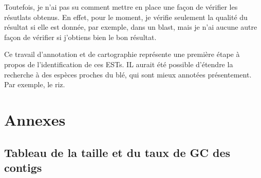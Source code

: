 \documentclass[10.9pt]{article} %
\renewcommand{\thesubsection}{\alph{subsection}}
\begin{document}
Toutefois, je n'ai pas su comment mettre en place une façon de vérifier les résutlats obtenus. En effet, pour le moment, je vérifie
seulement la qualité du résultat si elle est donnée, par exemple, dans un blast, mais je n'ai aucune autre façon de vérifier si
j'obtiens bien le bon résultat.

Ce travail d'annotation et de cartographie représente une première étape à propos de l'identification de ces ESTs. IL aurait été 
possible d'étendre la recherche à des espèces proches du blé, qui sont mieux annotées présentement. Par exemple, le riz.

\begingroup
\renewcommand{\appendix}{%
    \renewcommand{\thesubsection}{\arabic{subsection}}
}

\newpage
\appendix
\section{Annexes}

\subsection{Tableau de la taille et du taux de GC des contigs}\label{1}
\end{document}
